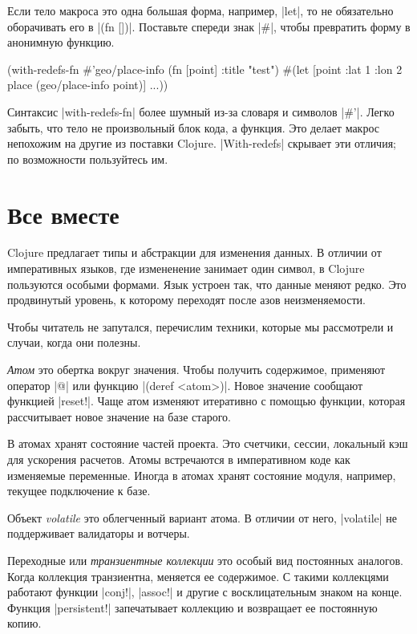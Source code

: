Если тело макроса это одна большая форма, например, \spverb|let|, то не
обязательно оборачивать его в \spverb|(fn [])|. Поставьте спереди знак
\spverb|#|, чтобы превратить форму в анонимную функцию.

\begin{english}
  \begin{clojure}
(with-redefs-fn
  {#'geo/place-info (fn [point] {:title "test"})}
  #(let [point {:lat 1 :lon 2}
         place (geo/place-info point)]
     ...))
  \end{clojure}
\end{english}

Синтаксис \spverb|with-redefs-fn| более шумный из-за словаря и символов
\spverb|#'|. Легко забыть, что тело не произвольный блок кода, а функция. Это
делает макрос непохожим на другие из поставки Clojure. \spverb|With-redefs|
скрывает эти отличия; по возможности пользуйтесь им.

\section{Все вместе}

Clojure предлагает типы и абстракции для изменения данных. В отличии от
императивных языков, где измененение занимает один символ, в Clojure пользуются
особыми формами. Язык устроен так, что данные меняют редко. Это продвинутый
уровень, к которому переходят после азов неизменяемости.

Чтобы читатель не запутался, перечислим техники, которые мы рассмотрели и
случаи, когда они полезны.

\emph{Атом} это обертка вокруг значения. Чтобы получить содержимое, применяют
оператор \spverb|@| или функцию \spverb|(deref <atom>)|. Новое значение сообщают
функцией \spverb|reset!|. Чаще атом изменяют итеративно с помощью функции,
которая рассчитывает новое значение на базе старого.

В атомах хранят состояние частей проекта. Это счетчики, сессии, локальный кэш
для ускорения расчетов. Атомы встречаются в императивном коде как изменяемые
переменные. Иногда в атомах хранят состояние модуля, например, текущее
подключение к базе.

Объект \emph{volatile} это облегченный вариант атома. В отличии от него,
\spverb|volatile| не поддерживает валидаторы и вотчеры.

Переходные или \emph{транзиентные коллекции} это особый вид постоянных
аналогов. Когда коллекция транзиентна, меняется ее содержимое. С такими
коллекцями работают функции \spverb|conj!|, \spverb|assoc!| и другие с
восклицательным знаком на конце. Функция \spverb|persistent!| запечатывает
коллекцию и возвращает ее постоянную копию.

